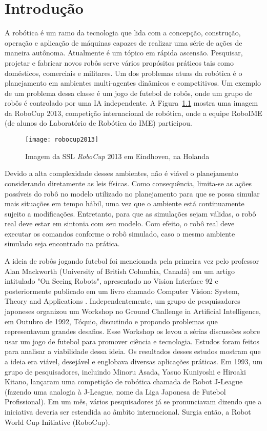 \chapter{Introdução}

A robótica é um ramo da tecnologia que lida com a concepção, construção,
operação e aplicação de máquinas capazes de realizar uma série de ações de
maneira autônoma.  Atualmente é um tópico em rápida ascensão.  Pesquisar,
projetar e fabricar novos robôs serve vários propósitos práticos tais como
domésticos, comerciais e militares.  Um dos problemas atuas da robótica é o
planejamento em ambientes multi-agentes dinâmicos e competitivos.  Um exemplo de
um problema dessa classe é um jogo de futebol de robôs, onde um grupo de robôs é
controlado por uma IA independente.  A Figura~\ref{fig:robocup2013} mostra uma
imagem da RoboCup 2013, competição internacional de robótica, onde a equipe
RoboIME (de alunos do Laboratório de Robótica do IME) participou.

\begin{figure}[h]
  \centering
  \texttt{[image: robocup2013]}
  \caption{Imagem da SSL \textit{RoboCup} 2013 em Eindhoven, na Holanda}\label{fig:robocup2013}
\end{figure}

Devido a alta complexidade desses ambientes, não é viável o planejamento
considerando diretamente as leis físicas.  Como consequência, limita-se as ações
possíveis do robô no modelo utilizado no planejamento para que se possa simular
mais situações em tempo hábil, uma vez que o ambiente está continuamente sujeito
a modificações.  Entretanto, para que as simulações sejam válidas, o robô real
deve estar em sintonia com seu modelo.  Com efeito, o robô real deve executar os
comandos conforme o robô simulado, caso o mesmo ambiente simulado seja
encontrado na prática.

A ideia de robôs jogando futebol foi mencionada pela primeira vez pelo professor
Alan Mackworth (University of British Columbia, Canadá) em um artigo intitulado
"On Seeing Robots", apresentado no Vision Interface 92 e posteriormente
publicado em um livro chamado Computer Vision: System, Theory and Applications
\cite{basu1993computer}.  Independentemente, um grupo de pesquisadores japoneses
organizou um Workshop no Ground Challenge in Artificial Intelligence, em Outubro
de 1992, Tóquio, discutindo e propondo problemas que representavam grandes
desafios.  Esse Workshop os levou a sérias discussões sobre usar um jogo de
futebol para promover ciência e tecnologia.  Estudos foram feitos para analisar
a viabilidade dessa ideia.  Os resultados desses estudos mostram que a ideia era
viável, desejável e englobava diversas aplicações práticas.  Em 1993, um grupo
de pesquisadores, incluindo Minoru Asada, Yasuo Kuniyoshi e Hiroaki Kitano,
lançaram uma competição de robótica chamada de Robot J-League (fazendo uma
analogia à J-League, nome da Liga Japonesa de Futebol Profissional).  Em um mês,
vários pesquisadores já se pronunciavam dizendo que a iniciativa deveria ser
estendida ao âmbito internacional.  Surgia então, a Robot World Cup Initiative
(RoboCup).


